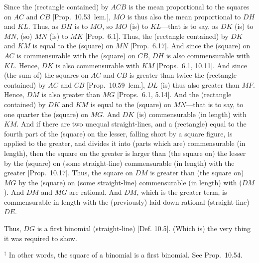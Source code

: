 \begin{Parallel}{}{}
{Since the (rectangle contained) by $ACB$ is the mean proportional to
 the squares on $AC$ and $CB$ [Prop.~10.53~lem.], $MO$ is thus also the
mean proportional to   $DH$ and $KL$. Thus,
as $DH$ is to $MO$, so $MO$ (is) to $KL$---that is to say, as $DK$
(is) to $MN$, (so) $MN$ (is) to $MK$ [Prop.~6.1].
Thus, the (rectangle contained) by $DK$ and $KM$ is equal
to the (square) on $MN$ [Prop.~6.17]. And since
the (square) on $AC$ is commensurable with the (square) on $CB$,
$DH$ is also commensurable with $KL$. Hence, $DK$
is also commensurable with $KM$ [Props.~6.1, 10.11].
And since (the sum of) the squares on $AC$ and $CB$ is greater
than twice the (rectangle contained) by $AC$ and $CB$ [Prop.~10.59~lem.], $DL$ (is) thus also
greater than $MF$. Hence, $DM$ is also greater than $MG$
[Props.~6.1, 5.14]. And
the (rectangle contained) by $DK$ and $KM$ is equal to
the (square) on $MN$---that is to say, to one quarter the (square) on $MG$.
And $DK$ (is) commensurable (in length) with $KM$. And if there are
two unequal straight-lines, and a (rectangle) equal to the fourth part
of the (square) on the lesser, falling short by a square figure, is applied to
the greater, and divides it into (parts which are) commensurable (in length),
then the square on the greater is larger than (the square on) the lesser by
the (square) on (some straight-line) commensurable (in length) with the greater [Prop.~10.17]. Thus,  the square on $DM$
is greater than (the square on) $MG$ by the (square) on (some straight-line)
commensurable (in length) with ($DM$). And $DM$ and $MG$ are rational. And
$DM$, which is the greater term, is commensurable in length with the (previously) laid down rational (straight-line) $DE$.

Thus, $DG$ is a first binomial (straight-line) [Def. 10.5]. (Which is) the very thing it was required to show.}
\end{Parallel}
{\footnotesize\noindent$^\dag$ In other words, the square of a binomial  is a
first binomial. See Prop.~10.54.}

